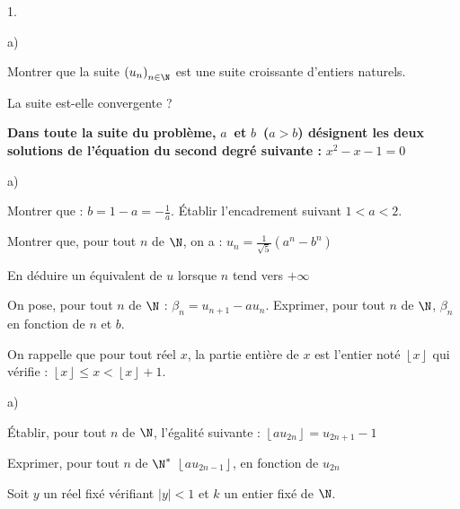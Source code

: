 \documentclass[11pt]{article}%
\begin{document}
\begin{noliste}{1.}
 \setlength{\itemsep}{4mm}
\item 

\begin{noliste}{a)}
 \setlength{\itemsep}{2mm}
\item Montrer que la suite $\left( u_{n}\right)_{n\in \N}$ est une
suite croissante d'entiers naturels.

\item La suite est-elle convergente ?
\end{noliste}

\textbf{Dans toute la suite du problème, }$a$\textbf{\ et }$b$\textbf{\
(}$a>b$\textbf{) désignent les deux solutions de l'équation du second
degré suivante : }$x^{2}-x-1 = 0$

\item 

\begin{noliste}{a)}
 \setlength{\itemsep}{2mm}
\item Montrer que : $b = 1-a = -\frac{1}{a}$. Établir l'encadrement
suivant $1<a<2$.

\item Montrer que, pour tout $n$ de $\N$, on a : $u_{n} =
\frac{1}{\sqrt{5}}\left( a^{n}-b^{n}\right) $

\item En déduire un équivalent de $u$ lorsque $n$ tend vers $ + \infty$
\end{noliste}

\item On pose, pour tout $n$ de $\N$ : $\beta_{n} = u_{n + 1}-au_{n}$.
Exprimer, pour tout $n$ de $\N$, $\beta_{n}$ en fonction de $n$ et $b
$.

\item On rappelle que pour tout réel $x$, la partie entière de $x$
est l'entier noté $\left\lfloor x\right\rfloor $ qui vérifie :
$\left\lfloor x\right\rfloor \leq x<\left\lfloor x\right\rfloor + 1$.

\begin{noliste}{a)}
 \setlength{\itemsep}{2mm}
\item Établir, pour tout $n$ de $\N$, l'égalité suivante :
$\left\lfloor au_{2n}\right\rfloor = u_{2n + 1}-1$

\item Exprimer, pour tout $n$ de $\N^{\ast}$ $\left\lfloor
au_{2n-1}\right\rfloor $, en fonction de $u_{2n}$
\end{noliste}

\item Soit $y$ un réel fixé vérifiant $\left| y\right|
<1 $ et $k$ un entier fixé de $\N$.


\end{noliste}
\end{document}
